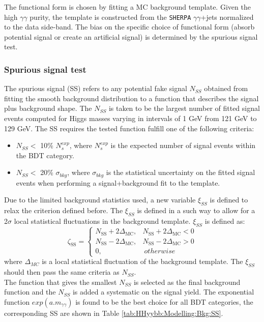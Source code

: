 The functional form is chosen by fitting a MC background template. Given the high $\gamma\gamma$ purity, the template is constructed from the \texttt{SHERPA} $\gamma\gamma$+jets normalized to the data side-band. The bias on the specific choice of functional form (absorb potential signal or create an artificial signal) is determined by the spurious signal test. 

\subsubsection{Spurious signal test}
\label{HHyybb:Modelling:Bkg:SS}
The spurious signal (SS) refers to any potential fake signal $N_{SS}$ obtained from fitting the smooth background distribution to a function that describes the signal plus background shape. The $N_{SS}$ is taken to be the largest number of fitted signal events computed for Higgs masses varying in intervals of 1 GeV from 121 GeV to 129 GeV. The SS requires the tested function fulfill one of the following criteria: 
\begin{itemize}
    \item $N_{SS} < $ 10\% $N_{s}^{exp}$, where $N_{s}^{exp}$ is the expected number of signal events within the BDT category. 
    \item $N_{SS} < $ 20\% $\sigma_{bkg}$, where $\sigma_{bkg}$ is the statistical uncertainty on the fitted signal events when performing a signal+background fit to the template. 
\end{itemize}

Due to the limited background statistics used, a new variable $\xi_{SS}$ is defined to relax the criterion defined before. The $\xi_{SS}$ is defined in a such way to allow for a 2$\sigma$ local statistical fluctuations in the background template. $\xi_{SS}$ is defined as: 
\begin{equation}
    \zeta_{\mathrm{SS}}=\left\{\begin{array}{ll}
N_{\mathrm{SS}}+2 \Delta_{\mathrm{MC}}, & N_{\mathrm{SS}}+2 \Delta_{\mathrm{MC}}<0 \\
N_{\mathrm{SS}}-2 \Delta_{\mathrm{MC}}, & N_{\mathrm{SS}}-2 \Delta_{\mathrm{MC}}>0 \\
0, & \  otherwise 
\end{array}\right.
\end{equation}
where $\Delta_{MC}$ is a local statistical fluctuation of the background template. The $\xi_{SS}$ should then pass the same criteria as $N_{SS}$. \\
The function that gives the smallest $N_{SS}$ is selected as the final background function and the $N_{SS}$ is added a systematic on the signal yield. The exponential function $exp(a.m_{\gamma\gamma})$ is found to be the best choice for all BDT categories, the corresponding SS are shown in Table \ref{tab:HHyybb:Modelling:Bkg:SS}.

